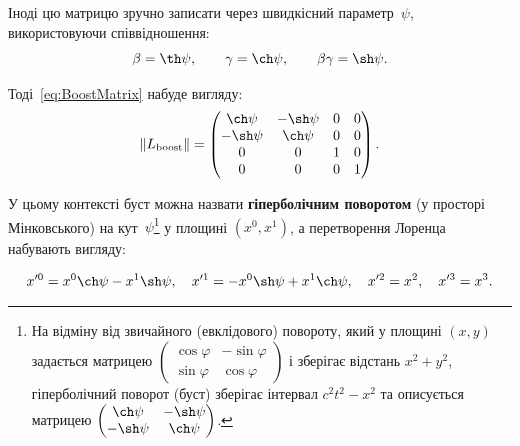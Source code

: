 Іноді цю матрицю зручно записати через швидкісний параметр~$\psi$, використовуючи співвідношення:
\begin{equation*}
  \beta = \th\psi, \qquad \gamma = \ch\psi, \qquad \beta\gamma = \sh\psi.
\end{equation*}

Тоді~\eqref{eq:BoostMatrix} набуде вигляду:
\begin{equation}\label{eq:boost_hyperbolic}
  \|L_\text{boost}\| =
  \begin{pmatrix}
    \ch\psi  & -\sh\psi & 0 & 0 \\
    -\sh\psi & \ch\psi  & 0 & 0 \\
    0        & 0        & 1 & 0 \\
    0        & 0        & 0 & 1
  \end{pmatrix}.
\end{equation}

У цьому контексті буст можна назвати \textbf{гіперболічним поворотом} (у просторі Мінковського) на кут~$\psi$\footnote{%
  На відміну від звичайного (евклідового) повороту, який у площині $(x, y)$ задається матрицею $\begin{pmatrix}
  \cos\varphi & -\sin\varphi \\ \sin\varphi & \cos\varphi \end{pmatrix}$ і зберігає відстань $x^2 + y^2$, гіперболічний
  поворот (буст) зберігає інтервал $c^2 t^2 - x^2$ та описується матрицею $\begin{pmatrix} \ch\psi & -\sh\psi \\
  -\sh\psi & \ch\psi \end{pmatrix}$.} у площині $(x^0, x^1)$, а перетворення Лоренца набувають вигляду:

\begin{equation*}
  x^{\prime 0} = x^0 \ch\psi - x^1 \sh\psi,\quad
  x^{\prime 1} = -x^0 \sh\psi + x^1 \ch\psi,\quad
  x^{\prime 2} = x^2,\quad
  x^{\prime 3} = x^3.
\end{equation*}

